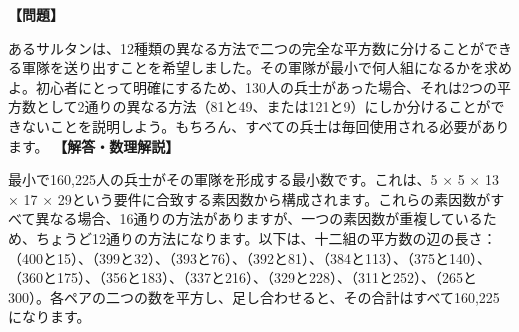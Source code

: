 \documentclass[10pt,a4paper,oneside,openany]{ltjsbook}
\begin{document}
\begin{tcolorbox}[colback=softblue,colframe=primaryblue,title=\textbf{第 136 問：サルタンの軍隊 （原題: THE SULTAN'S ARMY.）},arc=2mm,boxrule=1pt,breakable]
\textbf{【問題】}\par\vspace{0.3em}
あるサルタンは、12種類の異なる方法で二つの完全な平方数に分けることができる軍隊を送り出すことを希望しました。その軍隊が最小で何人組になるかを求めよ。初心者にとって明確にするため、130人の兵士があった場合、それは2つの平方数として2通りの異なる方法（81と49、または121と9）にしか分けることができないことを説明しよう。もちろん、すべての兵士は毎回使用される必要があります。
\tcblower
\textbf{【解答・数理解説】}\par\vspace{0.3em}
最小で160,225人の兵士がその軍隊を形成する最小数です。これは、5 × 5 × 13 × 17 × 29という要件に合致する素因数から構成されます。これらの素因数がすべて異なる場合、16通りの方法がありますが、一つの素因数が重複しているため、ちょうど12通りの方法になります。以下は、十二組の平方数の辺の長さ：（400と15）、（399と32）、（393と76）、（392と81）、（384と113）、（375と140）、（360と175）、（356と183）、（337と216）、（329と228）、（311と252）、（265と300）。各ペアの二つの数を平方し、足し合わせると、その合計はすべて160,225になります。
\end{tcolorbox}
\end{document}

